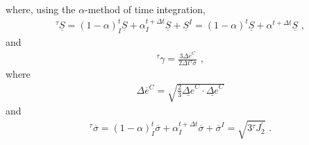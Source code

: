 where, using the $\alpha$-method of time integration,
\begin{gather}
^{\tau}\underline{S}=(1-\alpha)_{I}^{t}\underline{S}+\alpha\phantom{}_{I}^{t+\Delta t}\underline{S}+\underline{S}^{I}=(1-\alpha)^{t}\underline{S}+\alpha\phantom{}^{t+\Delta t}\underline{S}\,\,,\label{eq:46}
\end{gather}
and
\begin{gather}
^{\tau}\gamma=\frac{3\Delta\overline{e}^{C}}{2\Delta t\phantom{}^{\tau}\overline{\sigma}}\,\,,\label{eq:47}
\end{gather}
where
\begin{gather}
\Delta\overline{e}^{C}=\sqrt{\frac{2}{3}\underline{\Delta e}^{C}\cdot\underline{\Delta e}^{C}}\label{eq:48}
\end{gather}
and
\begin{gather}
^{\tau}\overline{\sigma}=(1-\alpha)_{I}^{t}\overline{\sigma}+\alpha\phantom{}_{I}^{t+\Delta t}\overline{\sigma}+\overline{\sigma}^{I}=\sqrt{3\phantom{}^{\tau}J_{2}^{\prime}}\,\,.\label{eq:49}
\end{gather}


